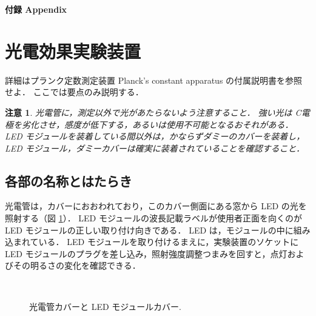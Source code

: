 \documentclass[11pt,sort]{jarticle}
\newtheorem{caution}{注意}
\begin{document}
\newpage
\appendix
\noindent
{\LARGE\bf 付録 Appendix}

\section{光電効果実験装置}\label{apdx:aparatus}

詳細はプランク定数測定装置 Planck's constant apparatus の付属説明書を参照せよ．
ここでは要点のみ説明する．

\begin{caution}
光電管に，測定以外で光があたらないよう注意すること．
強い光は C電極を劣化させ，感度が低下する，あるいは使用不可能となるおそれがある．
LED モジュールを装着している間以外は，かならずダミーのカバーを装着し，
LED モジュール，ダミーカバーは確実に装着されていることを確認すること．
\end{caution}

\subsection{各部の名称とはたらき}

光電管は，カバーにおおわれており，このカバー側面にある窓から LED の光を照射する（図 \ref{fig:phototube_cover}）．
LED モジュールの波長記載ラベルが使用者正面を向くのが LED モジュールの正しい取り付け向きである．
LED は，モジュールの中に組み込まれている．
LED モジュールを取り付けるまえに，実験装置のソケットに LED モジュールのプラグを差し込み，照射強度調整つまみを回すと，点灯およびその明るさの変化を確認できる．

\begin{figure}[t]
\begin{center}
\\
\caption{光電管カバーと LED モジュールカバー. }\label{fig:phototube_cover} 
\end{center}
\end{figure}
\end{document}
